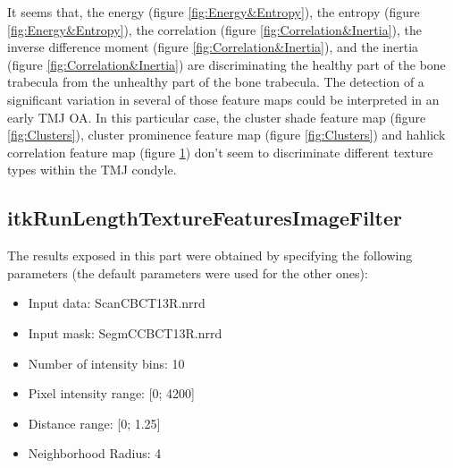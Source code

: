 \documentclass{InsightArticle}
\begin{document}
\begin{figure}[H]
\begin{center}
    \label{fig:Haralick}
  \end{center}
\end{figure}

It seems that, the energy (figure \ref{fig:Energy&Entropy}), the entropy (figure \ref{fig:Energy&Entropy}), the correlation (figure \ref{fig:Correlation&Inertia}), the inverse difference moment (figure \ref{fig:Correlation&Inertia}), and the inertia (figure \ref{fig:Correlation&Inertia}) are discriminating the healthy part of the bone trabecula from the unhealthy part of the bone trabecula. The detection of a significant variation in several of those feature maps could be interpreted in an early TMJ OA. In this particular case, the cluster shade feature map (figure \ref{fig:Clusters}), cluster prominence feature map (figure \ref{fig:Clusters}) and hahlick correlation feature map (figure \ref{fig:Haralick}) don't seem to discriminate different texture types within the TMJ condyle.



\subsection{itkRunLengthTextureFeaturesImageFilter}
\label{RLResults}

The results exposed in this part were obtained by specifying the following parameters (the default parameters were used for the other ones):

\begin{itemize}
 \item Input data: Scan\textunderscore CBCT\textunderscore 13R.nrrd
 \item Input mask: SegmC\textunderscore CBCT\textunderscore 13R.nrrd
 \item Number of intensity bins: 10
 \item Pixel intensity range: [0; 4200]
 \item Distance range: [0; 1.25]
 \item Neighborhood Radius: 4
\end{itemize}
\end{document}
